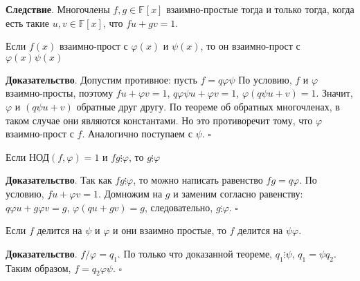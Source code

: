 \textbf{Следствие}. Многочлены $f,g\in\mathbb F[x]$ взаимно-простые тогда и
только тогда, когда есть такие $u,v\in\mathbb F[x]$, что $fu+gv=1$.
\begin{theor}
Если $f(x)$ взаимно-прост с $\varphi(x)$ и $\psi(x)$, то он взаимно-прост с
$\varphi(x)\psi(x)$  
\end{theor}
\textbf{Доказательство}. Допустим противное: пусть $f=q\varphi\psi$ По условию,
$f$ и $\varphi$ взаимно-просты, поэтому $fu+\varphi v=1$, $q\varphi
\psi u+\varphi v=1$, $\varphi(q\psi u+v)=1$. Значит, $\varphi$ и $(q\psi u+v)$
обратные друг другу. По теореме об обратных многочленах, в таком случае они
являются константами. Но это противоречит тому, что $\varphi$ взаимно-прост с
$f$. Аналогично поступаем с $\psi$. $\square$
\begin{theor}
Если НОД$(f,\varphi)=1$ и $fg\vdots\varphi$, то $g\vdots\varphi$
\end{theor}
\textbf{Доказательство}. Так как $fg\vdots\varphi$, то можно написать равенство
$fg=q\varphi$. По условию, $fu+\varphi v=1$. Домножим на $g$ и заменим согласно
равенству: $q\varphi u+g\varphi v=g$, $\varphi(qu+gv)=g$, следовательно, 
$g\vdots\varphi$. $\square$ 
\begin{theor}
Если $f$ делится на $\psi$ и $\varphi$ и они взаимно простые, то $f$ делится
на $\psi\varphi$.
\end{theor}
\textbf{Доказательство}. $f/\varphi=q_1$. По только что доказанной теореме,
$q_1\vdots \psi$, $q_1=\psi q_2$. Таким образом, $f=q_2\varphi\psi$. $\square$

